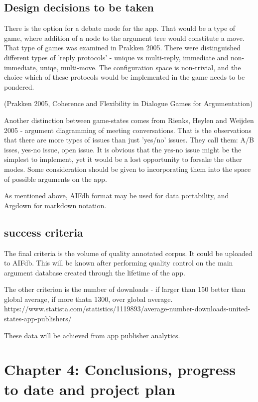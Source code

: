 \documentclass{article}
\begin{document}
\subsection{Design decisions to be taken}
There is the option for a debate mode for the app.
That would be a type of game, where addition of a node to the argument tree would constitute a move.
That type of games was examined in Prakken 2005.
There were distinguished different types of 'reply protocols' - unique vs multi-reply, immediate and non-immediate, uniqe, multi-move.
The configuration space is non-trivial, and the choice which of these protocols would be implemented in the game needs to be pondered.

(Prakken 2005, Coherence and Flexibility in Dialogue Games for Argumentation)

Another distinction between game-states comes from Rienks, Heylen and Weijden 2005 - argument diagramming of meeting conversations.
That is the observations that there are more types of issues than just 'yes/no' issues.
They call them: A/B isses, yes-no issue, open issue.
It is obvious that the yes-no issue might be the simplest to implement, yet it would be a lost opportunity to forsake the other modes.
Some consideration should be given to incorporating them into the space of possible arguments on the app.

As mentioned above, AIFdb format may be used for data portability, and Argdown for markdown notation.

\subsection{success criteria}
The final criteria is the volume of quality annotated corpus. It could be uploaded to AIFdb. 
This will be known after performing quality control on the main argument database created through the lifetime of the app. 

The other criterion is the number of downloads - if larger than 150 better than global average, if more thatn 1300, over global average.
https://www.statista.com/statistics/1119893/average-number-downloads-united-states-app-publishers/

These data will be achieved from app publisher analytics.

\section{Chapter 4: Conclusions, progress to date and project plan}
\end{document}
